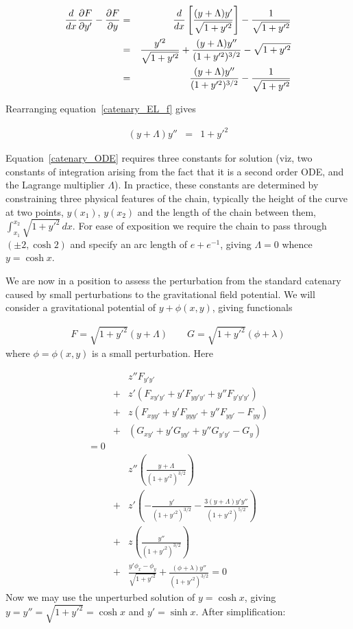 \documentclass[pdflatex,sn-mathphys-num]{sn-jnl}%
\theoremstyle{thmstyleone}%
\theoremstyle{thmstyletwo}%
\theoremstyle{thmstylethree}%
\begin{document}
\begin{eqnarray}
  \frac{d}{dx}\frac{\partial{F}}{\partial{y'}} - \frac{\partial{F}}{\partial{y}}
  &=& 
  \frac{d}{dx}\left[\frac{(y+\Lambda)y'}{\sqrt{1+y'^2}}\right] -  \frac{1}{\sqrt{1+y'^2}}\nonumber\\
&=&   \frac{y'^2}{\sqrt{1+y'^2}} + \frac{(y+\Lambda)y''}{(1+y'^2)^{3/2}} - \sqrt{1+y'^2}\nonumber\\
  &=&   \frac{(y+\Lambda)y''}{(1+y'^2)^{3/2}} - \frac{1}{\sqrt{1+y'^2}}
  \label{catenary_EL_f}
\end{eqnarray}

Rearranging equation~\ref{catenary_EL_f} gives

\begin{eqnarray}
  (y+\Lambda)y'' &=& 1+y'^2\label{catenary_ODE}
\end{eqnarray}

Equation~\ref{catenary_ODE} requires three constants for solution
(viz, two constants of integration arising from the fact that it is a
second order ODE, and the Lagrange multiplier $\Lambda$).  In
practice, these constants are determined by constraining three
physical features of the chain, typically the height of the curve at
two points, $y(x_1)$, $y(x_2)$ and the length of the chain between
them, $\int_{x_1}^{x_2}\sqrt{1+y'^2}\,dx$.  For ease of exposition we
require the chain to pass through $(\pm 2,\cosh 2)$ and specify an arc
length of $e+e^{-1}$, giving $\Lambda=0$ whence $y=\cosh x$.

We are now in a position to assess the perturbation from the standard
catenary caused by small perturbations to the gravitational field
potential.  We will consider a gravitational potential of $y +
\phi(x,y)$, giving functionals

\begin{eqnarray}\label{FandG}
F = \sqrt{1+y'^2}(y + \Lambda)\qquad G =  \sqrt{1+y'^2}(\phi + \lambda)
\end{eqnarray}
%
where $\phi=\phi(x,y)$ is a small perturbation.  Here 

\begin{eqnarray}
&{}& z''F_{y'y'}\nonumber\\
&+& z'(F_{xy'y'} + y'F_{yy'y'} + y''F_{y'y'y'})\nonumber\\
&+& z (F_{xyy'} + y'F_{yyy'} + y''F_{yy'}-F_{yy})\nonumber\\
&+& (G_{xy'} + y'G_{yy'} + y''G_{y'y'}- G_{y})\nonumber\\
= 0\\
&{}&  z''\left(\frac{y+\Lambda}{(1+y'^2)^{3/2}}\right)\nonumber\\
&+& z' \left(-\frac{y'}{(1+y'^2)^{3/2}} -\frac{3(y+\Lambda)y'y''}{(1+y'^2)^{5/2}}\right)\nonumber\\
&+& z  \left(\frac{y''}{(1+y'^2)^{3/2}}\right)\nonumber\\
&+& \frac{y'\phi_x-\phi_y}{\sqrt{1+y'^2}} + \frac{(\phi+\lambda)y''}{(1+y'^2)^{3/2}}=0
\end{eqnarray}
%
Now we may use the unperturbed solution of $y=\cosh x$, giving
$y=y''=\sqrt{1+y'^2}=\cosh x$ and $y'=\sinh x$.  After simplification:
\end{document}
